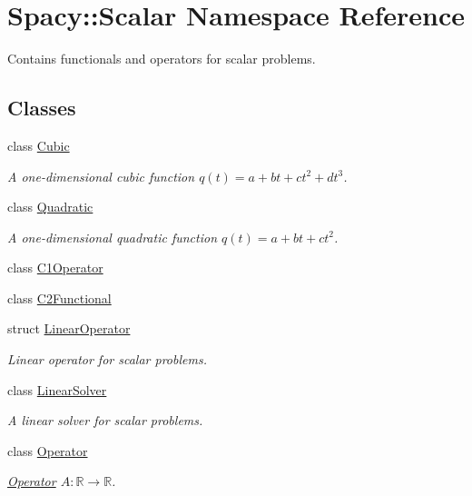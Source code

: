 \hypertarget{namespaceSpacy_1_1Scalar}{\section{Spacy\-:\-:Scalar Namespace Reference}
\label{namespaceSpacy_1_1Scalar}
}


Contains functionals and operators for scalar problems.  


\subsection*{Classes}
\begin{DoxyCompactItemize}
\item 
class \hyperlink{classSpacy_1_1Scalar_1_1Cubic}{Cubic}
\begin{DoxyCompactList}\small\item\em A one-\/dimensional cubic function $q(t) = a + bt + ct^2 + dt^3$. \end{DoxyCompactList}\item 
class \hyperlink{classSpacy_1_1Scalar_1_1Quadratic}{Quadratic}
\begin{DoxyCompactList}\small\item\em A one-\/dimensional quadratic function $q(t) = a + bt + ct^2$. \end{DoxyCompactList}\item 
class \hyperlink{classSpacy_1_1Scalar_1_1C1Operator}{C1\-Operator}
\item 
class \hyperlink{classSpacy_1_1Scalar_1_1C2Functional}{C2\-Functional}
\item 
struct \hyperlink{structSpacy_1_1Scalar_1_1LinearOperator}{Linear\-Operator}
\begin{DoxyCompactList}\small\item\em Linear operator for scalar problems. \end{DoxyCompactList}\item 
class \hyperlink{classSpacy_1_1Scalar_1_1LinearSolver}{Linear\-Solver}
\begin{DoxyCompactList}\small\item\em A linear solver for scalar problems. \end{DoxyCompactList}\item 
class \hyperlink{classSpacy_1_1Scalar_1_1Operator}{Operator}
\begin{DoxyCompactList}\small\item\em \hyperlink{classSpacy_1_1Scalar_1_1Operator}{Operator} $A:\mathbb{R}\rightarrow\mathbb{R}$. \end{DoxyCompactList}\end{DoxyCompactItemize}
